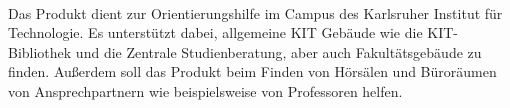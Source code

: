\paragraph*{}
Das Produkt dient zur Orientierungshilfe im Campus des Karlsruher Institut für Technologie.
Es unterstützt dabei, allgemeine KIT Gebäude wie die KIT-Bibliothek und die Zentrale Studienberatung, aber auch Fakultätsgebäude zu finden. 
Außerdem soll das Produkt beim Finden von Hörsälen und Büroräumen von Ansprechpartnern wie beispielsweise von Professoren helfen.